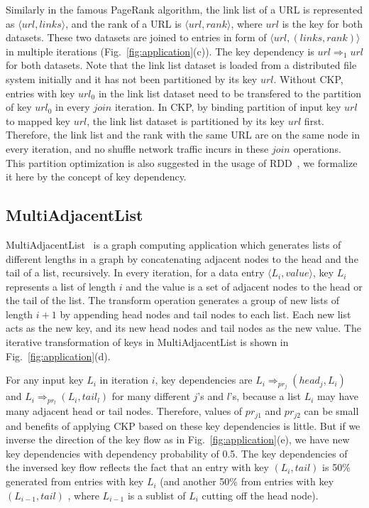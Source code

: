 \documentclass[10pt,journal,compsoc]{IEEEtran}
\begin{document}
Similarly in the famous PageRank algorithm, 
the link list of a URL is represented as $\langle url, links \rangle$,
and the rank of a URL is $\langle url, rank \rangle$, 
where $url$ is the key for both datasets. 
These two datasets are joined to entries in form of 
$\langle url, (links, rank) \rangle$ in multiple iterations (Fig.~\ref{fig:application}(c)).
The key dependency is $url \Rightarrow_{1} url$ for both datasets.
Note that the link list dataset is loaded from a distributed 
file system initially and it has not been partitioned 
by its key $url$. 
Without CKP, entries with key $url_0$ in the link list dataset need
to be transfered to the partition of key $url_0$ in every $join$ iteration.
In CKP, by binding partition of input key $url$ to mapped key $url$, 
the link list dataset is partitioned by its key $url$ first.
Therefore, the link list and the rank with the same URL 
are on the same node in every iteration, 
and no shuffle network traffic incurs in these $join$ operations. 
This partition optimization is also suggested in the usage 
of RDD~\cite{zaharia2012resilient}, 
we formalize it here by the concept of key dependency.


\subsection{MultiAdjacentList}
MultiAdjacentList~\cite{multiAdjList} is
a graph computing application which generates 
lists of different lengths in a graph by concatenating adjacent nodes 
to the head and the tail of a list, recursively.
In every iteration, for a data entry $\langle L_i, value \rangle$,
key $L_i$ represents a list of length $i$ and 
the value is a set of adjacent nodes to the head or the tail of the list.
The transform operation
generates a group of new lists of length $i+1$ by appending head
nodes and tail nodes to each list. Each new list acts as the new key, and
its new head nodes and tail nodes as the new value.
The iterative transformation of keys in MultiAdjacentList is shown in Fig.~\ref{fig:application}(d).

For any input key $L_i$ in iteration $i$, key dependencies 
are $L_i \Rightarrow_{pr_{j}} (head_{j}, L_i)$ and 
$L_i \Rightarrow_{pr_{l}} (L_i, tail_{l})$ for many different 
$j$'s and $l$'s, because a list $L_i$ may have many adjacent head
or tail nodes. Therefore, values of $pr_{j1}$ and $pr_{j2}$ can be 
small and benefits of applying CKP based on these 
key dependencies is little.
But if we inverse the direction of the key flow as 
in Fig.~\ref{fig:application}(e), we have new key dependencies with 
dependency probability of 0.5. 
The key dependencies of the inversed key flow 
reflects the fact that
an entry with key $(L_i, tail)$ is 50\% generated from entries with 
key $L_i$ (and another 50\% from entries with key $(L_{i-1}, tail)$
, where $L_{i-1}$ is a sublist of $L_i$ cutting off the head node).
\end{document}
